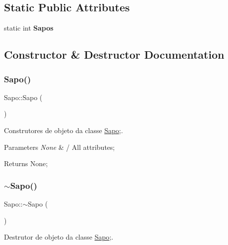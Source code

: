 \subsection*{Static Public Attributes}
\begin{DoxyCompactItemize}
\item 
\mbox{\label{class_sapo_a6722f4957ba4a54a6847eb1c846159b6}} 
static int {\bfseries Sapos}
\end{DoxyCompactItemize}


\subsection{Constructor \& Destructor Documentation}
\mbox{\label{class_sapo_a4dfbe2759140ed6903ff3e9389eae2c3}} 
\subsubsection{\texorpdfstring{Sapo()}{Sapo()}}
{\footnotesize\ttfamily Sapo\+::\+Sapo (\begin{DoxyParamCaption}{ }\end{DoxyParamCaption})}



Construtores de objeto da classe \mbox{\hyperlink{class_sapo}{Sapo}};. 


\begin{DoxyParams}{Parameters}
{\em None} & / All attributes; \\
\hline
\end{DoxyParams}
\begin{DoxyReturn}{Returns}
None; 
\end{DoxyReturn}
\mbox{\label{class_sapo_a3d1b73be223fc133f183e90c55d7f683}} 
\subsubsection{\texorpdfstring{$\sim$\+Sapo()}{~Sapo()}}
{\footnotesize\ttfamily Sapo\+::$\sim$\+Sapo (\begin{DoxyParamCaption}{ }\end{DoxyParamCaption})}



Destrutor de objeto da classe \mbox{\hyperlink{class_sapo}{Sapo}};. 


